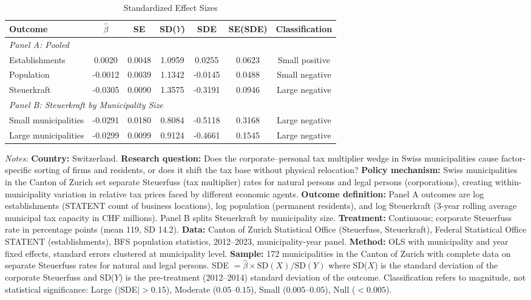 \begin{table}[t]
\centering
\caption{Standardized Effect Sizes}
\label{tab:sde}
\begin{tabular}{lcccccc}
\hline\hline
Outcome & $\hat{\beta}$ & SE & SD($Y$) & SDE & SE(SDE) & Classification \\
\hline
\multicolumn{7}{l}{\textit{Panel A: Pooled}} \\
Establishments & 0.0020 & 0.0048 & 1.0959 & 0.0255 & 0.0623 & Small positive \\
Population & -0.0012 & 0.0039 & 1.1342 & -0.0145 & 0.0488 & Small negative \\
Steuerkraft & -0.0305 & 0.0090 & 1.3575 & -0.3191 & 0.0946 & Large negative \\
\hline
\multicolumn{7}{l}{\textit{Panel B: Steuerkraft by Municipality Size}} \\
Small municipalities & -0.0291 & 0.0180 & 0.8084 & -0.5118 & 0.3168 & Large negative \\
Large municipalities & -0.0299 & 0.0099 & 0.9124 & -0.4661 & 0.1545 & Large negative \\
\hline\hline
\end{tabular}
\begin{tablenotes}
\item \textit{Notes:} \textbf{Country:} Switzerland. \textbf{Research question:} Does the corporate--personal tax multiplier wedge in Swiss municipalities cause factor-specific sorting of firms and residents, or does it shift the tax base without physical relocation? \textbf{Policy mechanism:} Swiss municipalities in the Canton of Zurich set separate Steuerfuss (tax multiplier) rates for natural persons and legal persons (corporations), creating within-municipality variation in relative tax prices faced by different economic agents. \textbf{Outcome definition:} Panel A outcomes are log establishments (STATENT count of business locations), log population (permanent residents), and log Steuerkraft (3-year rolling average municipal tax capacity in CHF millions). Panel B splits Steuerkraft by municipality size. \textbf{Treatment:} Continuous; corporate Steuerfuss rate in percentage points (mean 119, SD 14.2). \textbf{Data:} Canton of Zurich Statistical Office (Steuerfuss, Steuerkraft), Federal Statistical Office STATENT (establishments), BFS population statistics, 2012--2023, municipality-year panel. \textbf{Method:} OLS with municipality and year fixed effects, standard errors clustered at municipality level. \textbf{Sample:} 172 municipalities in the Canton of Zurich with complete data on separate Steuerfuss rates for natural and legal persons. SDE $= \hat{\beta} \times \text{SD}(X) / \text{SD}(Y)$ where SD($X$) is the standard deviation of the corporate Steuerfuss and SD($Y$) is the pre-treatment (2012--2014) standard deviation of the outcome. Classification refers to magnitude, not statistical significance: Large ($|$SDE$| > 0.15$), Moderate ($0.05$--$0.15$), Small ($0.005$--$0.05$), Null ($< 0.005$).
\end{tablenotes}
\end{table}

